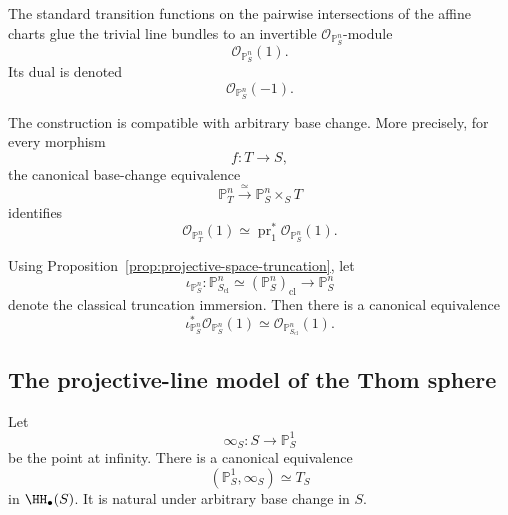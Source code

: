 \begin{construction}
\label{constr:spectral-O-one}
The standard transition functions on the pairwise intersections of the
affine charts glue the trivial line bundles to an invertible
\(\mathcal O_{\mathbb P^n_S}\)-module
\[
    \mathcal O_{\mathbb P^n_S}(1).
\]
Its dual is denoted
\[
    \mathcal O_{\mathbb P^n_S}(-1).
\]

The construction is compatible with arbitrary base change.  More precisely,
for every morphism
\[
    f:T\longrightarrow S,
\]
the canonical base-change equivalence
\[
    \mathbb P^n_T
    \xrightarrow{\simeq}
    \mathbb P^n_S\times_ST
\]
identifies
\[
    \mathcal O_{\mathbb P^n_T}(1)
    \simeq
    \operatorname{pr}_1^*
    \mathcal O_{\mathbb P^n_S}(1).
\]

Using
Proposition~\ref{prop:projective-space-truncation},
let
\[
    \iota_{\mathbb P^n_S}:
    \mathbb P^n_{S_{\mathrm{cl}}}
    \simeq
    (\mathbb P^n_S)_{\mathrm{cl}}
    \longrightarrow
    \mathbb P^n_S
\]
denote the classical truncation immersion.  Then there is a canonical
equivalence
\[
    \iota_{\mathbb P^n_S}^*
    \mathcal O_{\mathbb P^n_S}(1)
    \simeq
    \mathcal O_{\mathbb P^n_{S_{\mathrm{cl}}}}(1).
\]
\end{construction}

\subsection{The projective-line model of the Thom sphere}

\begin{proposition}
\label{prop:spectral-P1-T}
Let
\[
    \infty_S:S\longrightarrow\mathbb P^1_S
\]
be the point at infinity.  There is a canonical equivalence
\[
    (\mathbb P^1_S,\infty_S)
    \simeq
    T_S
\]
in \(\HH_\bullet(S)\).  It is natural under arbitrary base change in
\(S\).
\end{proposition}


